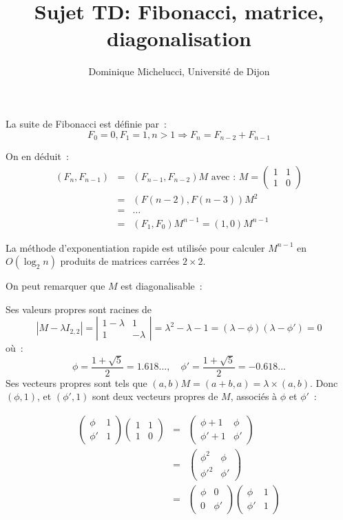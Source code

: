 \documentclass[a4paper]{article}
\begin{document}
\title{Sujet TD:  Fibonacci, matrice, diagonalisation}
\author{Dominique Michelucci, Universit\'e de Dijon}
\date{}
\maketitle

La suite de Fibonacci est d\'efinie par~:
$$F_0=0, F_1=1, n > 1 \Rightarrow F_n=F_{n-2}+F_{n-1}$$

On en d\'eduit~:
\begin{eqnarray*}
(F_n, F_{n-1}) &=& (F_{n-1}, F_{n-2}) M \mbox{   avec :  } M=\left(\begin{array}{cc}1 & 1 \\ 1 & 0 \end{array}\right) \\
&=& (F(n-2), F(n-3)) M^{2} \\ 
&=& \ldots \\
&=& (F_1, F_0) M^{n-1}  = (1, 0) M^{n-1}
\end{eqnarray*}

La m\'ethode d'exponentiation rapide est utilis\'ee pour calculer $M^{n-1}$ en $O(\log_2 n)$ produits de matrices carr\'ees $2 \times 2$.

On peut remarquer que $M$ est diagonalisable~:

Ses valeurs propres sont racines de 
$$|M- \lambda I_{2,2}| =\left| \begin{array}{cc} 1-\lambda & 1 \\ 1 & -\lambda \end{array}\right|= \lambda^2-\lambda-1=(\lambda -\phi)(\lambda -\phi')=0$$
o\`u~:
$$\phi= \frac{1+\sqrt{5}}{2}=1.618..., \quad \phi'=\frac{1+\sqrt{5}}{2}=-0.618...$$
Ses vecteurs propres sont tels que 
$(a, b)M= (a+b, a) = \lambda \times (a, b)$. Donc $(\phi, 1)$, et $(\phi', 1)$ sont deux vecteurs propres de $M$, associ\'es \`a $\phi$ et $\phi'$~:

 
\begin{eqnarray*}
\left( \begin{array}{cc} \phi & 1 \\ \phi' & 1\end{array}\right) \left(\begin{array}{cc}1 & 1 \\ 1 & 0 \end{array}\right) &=& \left( \begin{array}{cc} \phi+1 & \phi \\ \phi'+1 & \phi' \end{array}\right) \\
&=& \left( \begin{array}{cc}  \phi^2 & \phi \\   \phi'^2 & \phi'  \end{array}\right) \\
&=& \left( \begin{array}{cc}  \phi & 0 \\ 0 & \phi'\end{array}\right) \left( \begin{array}{cc} \phi & 1 \\ \phi' & 1\end{array}\right) 
\end{eqnarray*}
\end{document}
